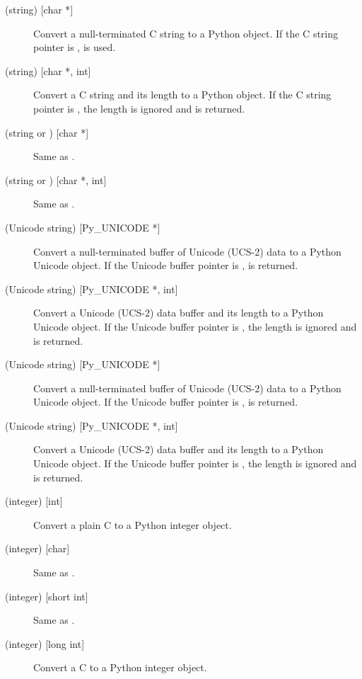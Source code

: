 \documentclass{manual}
\begin{document}
\begin{description}

\item[ (string) {[char *]}]
Convert a null-terminated C string to a Python object.  If the C
string pointer is \NULL{},  is used.

\item[ (string) {[char *, int]}]
Convert a C string and its length to a Python object.  If the C string
pointer is \NULL{}, the length is ignored and  is
returned.

\item[ (string or ) {[char *]}]
Same as .

\item[ (string or ) {[char *, int]}]
Same as .

\item[ (Unicode string) {[Py_UNICODE *]}]
Convert a null-terminated buffer of Unicode (UCS-2) data to a Python
Unicode object.  If the Unicode buffer pointer is \NULL,
 is returned.

\item[ (Unicode string) {[Py_UNICODE *, int]}]
Convert a Unicode (UCS-2) data buffer and its length to a Python
Unicode object.   If the Unicode buffer pointer is \NULL, the length
is ignored and  is returned.

\item[ (Unicode string) {[Py_UNICODE *]}]
Convert a null-terminated buffer of Unicode (UCS-2) data to a Python Unicode 
object. If the Unicode buffer pointer is \NULL{},  is returned.

\item[ (Unicode string) {[Py_UNICODE *, int]}]
Convert a Unicode (UCS-2) data buffer and its length to a Python Unicode 
object. If the Unicode buffer pointer is \NULL{}, the length is ignored and 
 is returned.

\item[ (integer) {[int]}]
Convert a plain C  to a Python integer object.

\item[ (integer) {[char]}]
Same as .

\item[ (integer) {[short int]}]
Same as .

\item[ (integer) {[long int]}]
Convert a C  to a Python integer object.


\end{description}
\end{document}
